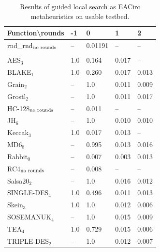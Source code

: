 \documentclass[
  print, %
  Table,   %
  nolof,     %
  nolot,     %
  11pt, %
  oneside  %
]{fithesis3}
\newcommand{\fd}{\cellcolor{red!13}}
\newcommand{\fn}{\cellcolor{green!13}}
\begin{document}
\begin{table}[H]
\centering
\begin{tabular}{l|l l l l}
Function\textbackslash{}rounds & -1 & 0 & 1 & 2\\ \hline
rnd\_rnd$_{\textnormal{no rounds}}$ & -- & \fn{}0.01191& --  & --   \\\\
AES$_{3}$        & \fd{}1.0   & \fd{}0.164 & \fn{}0.017 & \fn{}--   \\
BLAKE$_{1}$      & \fd{}1.0   & \fd{}0.260 & \fn{}0.017 & \fn{}0.013\\
Grain$_{2}$      & \fd{}--    & \fd{}1.0   & \fn{}0.011 & \fn{}0.009\\
Grostl$_{2}$     & \fd{}--    & \fd{}1.0   & \fn{}0.011 & \fn{}0.017\\
HC-128$_{\textnormal{no rounds}}$& -- & \fn{}0.011 & -- & --        \\
JH$_{6}$         & \fd{}--    & \fd{}1.0   & \fn{}0.010 & \fn{}0.010\\
Keccak$_{3}$     & \fd{}1.0   & \fn{}0.017 & \fn{}0.013 & \fn{}--   \\
MD6$_{8}$        & \fd{}--    & \fd{}0.995 & \fn{}0.013 & \fn{}0.016\\
Rabbit$_{0}$     &      --    & \fn{}0.007 & \fn{}0.003 & \fn{}0.013\\
RC4$_{\textnormal{no rounds}}$& -- & \fn{}0.008 & --    & --        \\
Salsa20$_{2}$    & \fd{}--    & \fd{}1.0   & \fn{}0.016 & \fn{}0.012\\
SINGLE-DES$_{4}$ & \fd{}1.0   & \fd{}0.496 & \fn{}0.011 & \fn{}0.013\\
Skein$_{3}$      & \fd{}1.0   & \fd{}1.0   & \fn{}0.012 & \fn{}0.006\\
SOSEMANUK$_{4}$  & \fd{}--    & \fd{}1.0   & \fn{}0.015 & \fn{}0.009\\
TEA$_{4}$        & \fd{}1.0   & \fd{}0.729 & \fn{}0.015 & \fn{}0.006\\
TRIPLE-DES$_{2}$ & \fd{}--    & \fd{}1.0   & \fn{}0.012 & \fn{}0.007
\end{tabular}
\caption{Results of guided local search as EACirc metaheuristics on usable testbed.}
\label{table:res-usable-gls}
\end{table}
\end{document}
